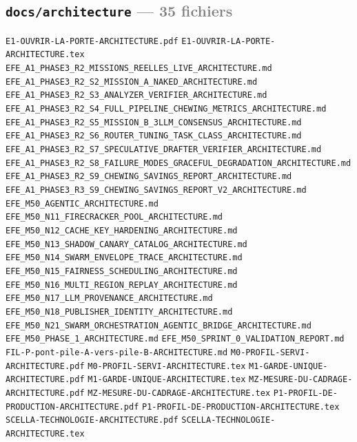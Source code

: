 \documentclass[10pt]{report}
\newcommand{\code}[1]{\texttt{\small #1}}
\begin{document}
\subsection*{\code{docs/architecture} \normalfont\textcolor{grey}{--- 35 fichiers}}
\begin{sloppypar}\footnotesize\raggedright
\code{E1-OUVRIR-LA-PORTE-ARCHITECTURE.pdf} \;\textbullet\; \code{E1-OUVRIR-LA-PORTE-ARCHITECTURE.tex} \;\textbullet\; \code{EFE\_A1\_PHASE3\_R2\_MISSIONS\_REELLES\_LIVE\_ARCHITECTURE.md} \;\textbullet\; \code{EFE\_A1\_PHASE3\_R2\_S2\_MISSION\_A\_NAKED\_ARCHITECTURE.md} \;\textbullet\; \code{EFE\_A1\_PHASE3\_R2\_S3\_ANALYZER\_VERIFIER\_ARCHITECTURE.md} \;\textbullet\; \code{EFE\_A1\_PHASE3\_R2\_S4\_FULL\_PIPELINE\_CHEWING\_METRICS\_ARCHITECTURE.md} \;\textbullet\; \code{EFE\_A1\_PHASE3\_R2\_S5\_MISSION\_B\_3LLM\_CONSENSUS\_ARCHITECTURE.md} \;\textbullet\; \code{EFE\_A1\_PHASE3\_R2\_S6\_ROUTER\_TUNING\_TASK\_CLASS\_ARCHITECTURE.md} \;\textbullet\; \code{EFE\_A1\_PHASE3\_R2\_S7\_SPECULATIVE\_DRAFTER\_VERIFIER\_ARCHITECTURE.md} \;\textbullet\; \code{EFE\_A1\_PHASE3\_R2\_S8\_FAILURE\_MODES\_GRACEFUL\_DEGRADATION\_ARCHITECTURE.md} \;\textbullet\; \code{EFE\_A1\_PHASE3\_R2\_S9\_CHEWING\_SAVINGS\_REPORT\_ARCHITECTURE.md} \;\textbullet\; \code{EFE\_A1\_PHASE3\_R3\_S9\_CHEWING\_SAVINGS\_REPORT\_V2\_ARCHITECTURE.md} \;\textbullet\; \code{EFE\_M50\_AGENTIC\_ARCHITECTURE.md} \;\textbullet\; \code{EFE\_M50\_N11\_FIRECRACKER\_POOL\_ARCHITECTURE.md} \;\textbullet\; \code{EFE\_M50\_N12\_CACHE\_KEY\_HARDENING\_ARCHITECTURE.md} \;\textbullet\; \code{EFE\_M50\_N13\_SHADOW\_CANARY\_CATALOG\_ARCHITECTURE.md} \;\textbullet\; \code{EFE\_M50\_N14\_SWARM\_ENVELOPE\_TRACE\_ARCHITECTURE.md} \;\textbullet\; \code{EFE\_M50\_N15\_FAIRNESS\_SCHEDULING\_ARCHITECTURE.md} \;\textbullet\; \code{EFE\_M50\_N16\_MULTI\_REGION\_REPLAY\_ARCHITECTURE.md} \;\textbullet\; \code{EFE\_M50\_N17\_LLM\_PROVENANCE\_ARCHITECTURE.md} \;\textbullet\; \code{EFE\_M50\_N18\_PUBLISHER\_IDENTITY\_ARCHITECTURE.md} \;\textbullet\; \code{EFE\_M50\_N21\_SWARM\_ORCHESTRATION\_AGENTIC\_BRIDGE\_ARCHITECTURE.md} \;\textbullet\; \code{EFE\_M50\_PHASE\_1\_ARCHITECTURE.md} \;\textbullet\; \code{EFE\_M50\_SPRINT\_0\_VALIDATION\_REPORT.md} \;\textbullet\; \code{FIL-P-pont-pile-A-vers-pile-B-ARCHITECTURE.md} \;\textbullet\; \code{M0-PROFIL-SERVI-ARCHITECTURE.pdf} \;\textbullet\; \code{M0-PROFIL-SERVI-ARCHITECTURE.tex} \;\textbullet\; \code{M1-GARDE-UNIQUE-ARCHITECTURE.pdf} \;\textbullet\; \code{M1-GARDE-UNIQUE-ARCHITECTURE.tex} \;\textbullet\; \code{MZ-MESURE-DU-CADRAGE-ARCHITECTURE.pdf} \;\textbullet\; \code{MZ-MESURE-DU-CADRAGE-ARCHITECTURE.tex} \;\textbullet\; \code{P1-PROFIL-DE-PRODUCTION-ARCHITECTURE.pdf} \;\textbullet\; \code{P1-PROFIL-DE-PRODUCTION-ARCHITECTURE.tex} \;\textbullet\; \code{SCELLA-TECHNOLOGIE-ARCHITECTURE.pdf} \;\textbullet\; \code{SCELLA-TECHNOLOGIE-ARCHITECTURE.tex}
\end{sloppypar}
\end{document}
